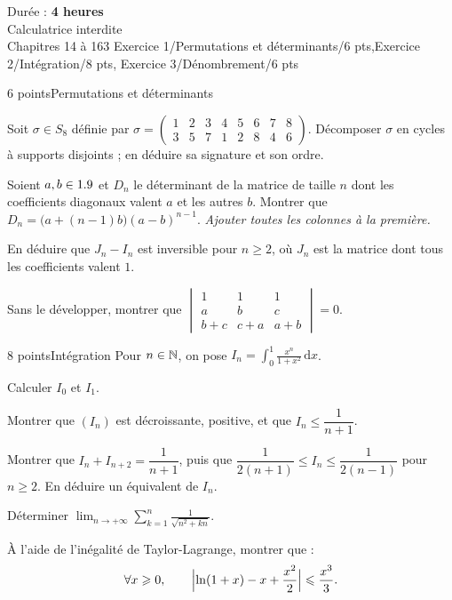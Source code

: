 
  {Durée : \textbf{4 heures}\\Calculatrice interdite\\Chapitres 14 à 16}{3}
  {Exercice 1/Permutations et déterminants/6 pts,Exercice 2/Intégration/8 pts,%
   Exercice 3/Dénombrement/6 pts}

\begin{exoEval}{6 points}{Permutations et déterminants}
\begin{questions}
  \item Soit $\sigma\in S_8$ définie par
    $\sigma=\begin{pmatrix}1&2&3&4&5&6&7&8\\3&5&7&1&2&8&4&6\end{pmatrix}$.
    Décomposer $\sigma$ en cycles à supports disjoints ; en déduire sa
    signature et son ordre.
  \item Soient $a,b\in1.9$ et $D_n$ le déterminant de la matrice de taille
    $n$ dont les coefficients diagonaux valent $a$ et les autres $b$.
    Montrer que $D_n=\bigl(a+(n-1)b\bigr)(a-b)^{n-1}$. \emph{Ajouter toutes
    les colonnes à la première.}
  \item En déduire que $J_n-I_n$ est inversible pour $n\geqslant2$, où
    $J_n$ est la matrice dont tous les coefficients valent $1$.
  \item Sans le développer, montrer que
    $\begin{vmatrix}1&1&1\\a&b&c\\b+c&c+a&a+b\end{vmatrix}=0$.
\end{questions}
\end{exoEval}

\begin{exoEval}{8 points}{Intégration}
Pour $n\in\mathbb{N}$, on pose $I_n=\displaystyle\int_0^{1}\frac{x^{n}}{1+x^{2}}\,\mathrm{d}x$.
\begin{questions}
  \item Calculer $I_0$ et $I_1$.
  \item Montrer que $(I_n)$ est décroissante, positive, et que
    $I_n\leqslant\dfrac{1}{n+1}$.
  \item Montrer que $I_n+I_{n+2}=\dfrac{1}{n+1}$, puis que
    $\dfrac{1}{2(n+1)}\leqslant I_n\leqslant\dfrac{1}{2(n-1)}$ pour
    $n\geqslant2$. En déduire un équivalent de $I_n$.
  \item Déterminer $\displaystyle\lim_{n\to+\infty}\sum_{k=1}^{n}\frac{1}{\sqrt{n^{2}+kn}}$.
  \item À l'aide de l'inégalité de Taylor-Lagrange, montrer que :
    \[\forall x\geqslant0,\qquad
      \Bigl|\ln(1+x)-x+\frac{x^{2}}{2}\Bigr|\leqslant\frac{x^{3}}{3}.\]
\end{questions}
\end{exoEval}

